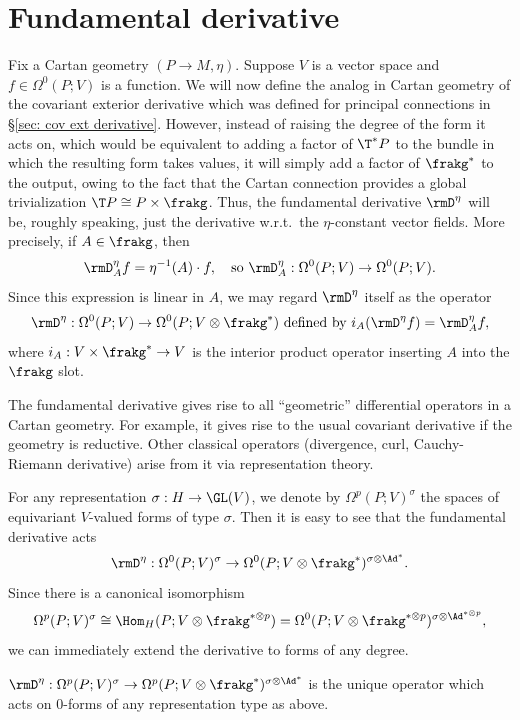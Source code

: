 \section{Fundamental derivative}\label{sec: fundamental derivative}


Fix a Cartan geometry $(P\to M,\eta)$. Suppose $V$ is a vector space and $f\in \Omega^0(P;V)$ is a function. We will now define the analog in Cartan geometry of the covariant exterior derivative which was defined for principal connections in \S\ref{sec: cov ext derivative}. However, instead of raising the degree of the form it acts on, which would be equivalent to adding a factor of $\T^\ast P$ to the bundle in which the resulting form takes values, it will simply add a factor of $\frakg^\ast$ to the output, owing to the fact that the Cartan connection provides a global trivialization $\T P\cong P\times\frakg$. Thus, the fundamental derivative $\rmD^\eta$ will be, roughly speaking, just the derivative w.r.t.\ the $\eta$-constant vector fields. More precisely, if $A\in\frakg$, then 
\[\rmD^\eta_A f=\eta^{-1}(A)\cdot f,\quad \text{so }\rmD^\eta_A:\Omega^0(P;V)\to \Omega^0(P;V).\]
Since this expression is linear in $A$, we may regard $\rmD^\eta$ itself as the operator 
\[\rmD^\eta:\Omega^0(P;V)\to \Omega^0(P;V\otimes\frakg^\ast)\text{ defined by }i_{A}(\rmD^\eta f)=\rmD^\eta_A f,\]
where $i_A:V\times\frakg^\ast\to V$ is the interior product operator inserting $A$ into the $\frakg$ slot.

The fundamental derivative gives rise to all ``geometric'' differential operators in a Cartan geometry. For example, it gives rise to the usual covariant derivative if the geometry is reductive. Other classical operators (divergence, curl, Cauchy-Riemann derivative) arise from it via representation theory.

For any representation $\sigma:H\to \GL(V)$, we denote by 
$\Omega^p(P;V)^\sigma$ the spaces of equivariant $V$-valued forms of type $\sigma$. Then it is easy to see that the fundamental derivative acts 
\[\rmD^\eta:\Omega^0(P;V)^\sigma\to \Omega^0(P;V\otimes\frakg^\ast)^{\sigma\otimes\Ad^\ast}.\]
Since there is a canonical isomorphism 
\[\Omega^p(P;V)^\sigma\cong \Hom_H (P;V\otimes \frakg^{\ast\otimes p})=\Omega^0(P;V\otimes \frakg^{\ast\otimes p})^{\sigma\otimes\Ad^{\ast\otimes p}},\] we can immediately extend the derivative to forms of any degree.

\begin{defn}
    $\rmD^\eta:\Omega^p(P;V)^\sigma\to \Omega^p(P;V\otimes\frakg^\ast)^{\sigma\otimes\Ad^\ast}$ is the unique operator which acts on $0$-forms of any representation type as above.
\end{defn}

